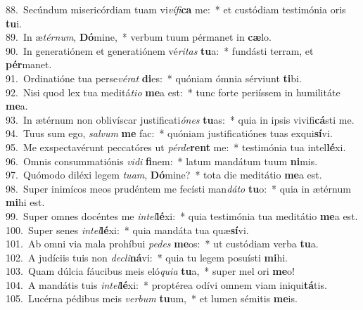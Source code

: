 {88.~}Secúndum misericórdiam tuam vi\textit{ví}\textit{fi}\textbf{ca} me:~* et custódiam testimónia oris \textbf{tu}i.\\
{89.~}In æ\textit{tér}\textit{num}, \textbf{Dó}mine,~* verbum tuum pérmanet in \textbf{cæ}lo.\\
{90.~}In generatiónem et generatiónem vé\textit{ri}\textit{tas} \textbf{tu}a:~* fundásti terram, et \textbf{pér}manet.\\
{91.~}Ordinatióne tua perse\textit{vé}\textit{rat} \textbf{di}es:~* quóniam ómnia sérviunt \textbf{ti}bi.\\
{92.~}Nisi quod lex tua meditá\textit{ti}\textit{o} \textbf{me}a est:~* tunc forte periíssem in humilitáte \textbf{me}a.\\
{93.~}In ætérnum non oblivíscar justificati\textit{ó}\textit{nes} \textbf{tu}as:~* quia in ipsis vivifi\textbf{cá}sti me.\\
{94.~}Tuus sum ego, \textit{sal}\textit{vum} \textbf{me} fac:~* quóniam justificatiónes tuas exqui\textbf{sí}vi.\\
{95.~}Me exspectavérunt peccatóres ut \textit{pér}\textit{de}\textbf{rent} me:~* testimónia tua intel\textbf{lé}xi.\\
{96.~}Omnis consummatiónis \textit{vi}\textit{di} \textbf{fi}nem:~* latum mandátum tuum \textbf{ni}mis.\\
{97.~}Quómodo diléxi legem \textit{tu}\textit{am}, \textbf{Dó}mine?~* tota die meditátio \textbf{me}a est.\\
{98.~}Super inimícos meos prudéntem me fecísti man\textit{dá}\textit{to} \textbf{tu}o:~* quia in ætérnum \textbf{mi}hi est.\\
{99.~}Super omnes docéntes me \textit{in}\textit{tel}\textbf{lé}xi:~* quia testimónia tua meditátio \textbf{me}a est.\\
{100.~}Super senes \textit{in}\textit{tel}\textbf{lé}xi:~* quia mandáta tua quæ\textbf{sí}vi.\\
{101.~}Ab omni via mala prohíbui \textit{pe}\textit{des} \textbf{me}os:~* ut custódiam verba \textbf{tu}a.\\
{102.~}A judíciis tuis non \textit{de}\textit{cli}\textbf{ná}vi:~* quia tu legem posuísti \textbf{mi}hi.\\
{103.~}Quam dúlcia fáucibus meis eló\textit{qui}\textit{a} \textbf{tu}a,~* super mel ori \textbf{me}o!\\
{104.~}A mandátis tuis \textit{in}\textit{tel}\textbf{lé}xi:~* proptérea odívi omnem viam iniqui\textbf{tá}tis.\\
{105.~}Lucérna pédibus meis \textit{ver}\textit{bum} \textbf{tu}um,~* et lumen sémitis \textbf{me}is.\\
